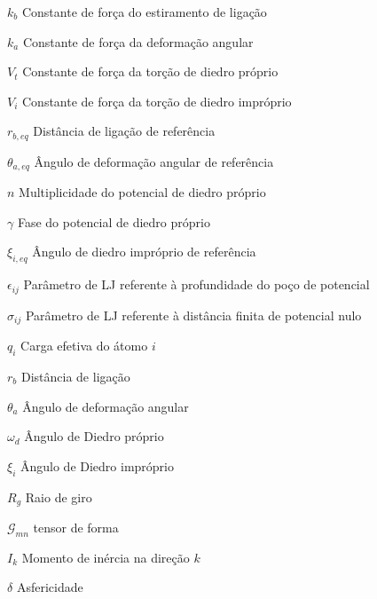 \documentclass[
	12pt,				%
	openright,			%
	twoside,			%
	a4paper,			%
	english,			%
	french,				%
	spanish,			%
	brazil				%
	]{abntex2}
\newcommand\mat[1]{\mathcal{#1}}
\let\oldtextual\textual        %
\renewcommand{\textual}{%
  \oldtextual%
  \pagenumbering{arabic} %
}
\begin{document}
\begin{simbolos}
  \item[$k_b$] Constante de força do estiramento de ligação 
  \item[$k_a$] Constante de força da deformação angular
  \item[$V_t$] Constante de força da torção de diedro próprio
  \item[$V_i$] Constante de força da torção de diedro impróprio
  \item[$r_{b,eq}$] Distância de ligação de referência
  \item[$\theta_{a,eq}$] Ângulo de deformação angular de referência
  \item[$n$] Multiplicidade do potencial de diedro próprio
  \item[$\gamma$] Fase do potencial de diedro próprio
  \item[$\xi_{i,eq}$] Ângulo de diedro impróprio de referência
  \item[$\epsilon_{ij}$] Parâmetro de LJ referente à profundidade do poço de potencial
  \item[$\sigma_{ij}$] Parâmetro de LJ referente à distância finita de potencial nulo
  \item[$q_i$] Carga efetiva do átomo $i$
  \item[$r_b$] Distância de ligação
  \item[$\theta_a$] Ângulo de deformação angular
  \item[$\omega_d$] Ângulo de Diedro próprio
  \item[$\xi_i$] Ângulo de Diedro impróprio
  \item[$ R_g $] Raio de giro
  \item[$ \mat{G}_{mn} $] tensor de forma
  \item[$ I_k $] Momento de inércia na direção $k$
  \item[$ \delta $] Asfericidade
\end{simbolos}

\tableofcontents*
\cleardoublepage



\textual






\end{document}
